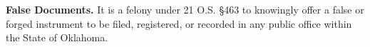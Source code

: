 \textbf{False Documents.}
It is a felony under 21 O.S. §463 to knowingly offer a false or forged
instrument to be filed, registered, or recorded in any public office within the
State of Oklahoma.